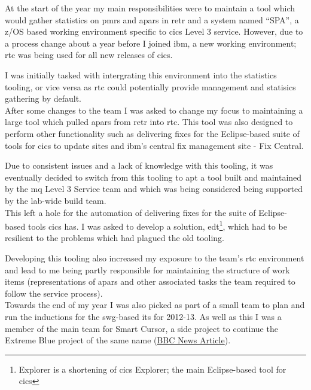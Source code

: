\documentclass[a4paper,11pt]{report}
\begin{document}
At the start of the year my main responsibilities were to maintain a tool which would gather 
statistics on \gls{pmr}s and \gls{apar}s in \gls{retr} and a system named ``SPA'', a z/OS based
working environment specific to \gls{cics} Level 3 service. However, due to a process change about
a year before I joined \gls{ibm}, a new working environment; \gls{rtc} was being used for all new
releases of \gls{cics}.

I was initially tasked with intergrating this environment into the 
statistics tooling, or vice versa as \gls{rtc} could potentially provide management and statisics
gathering by default. \\



After some changes to the team I was asked to change my focus to maintaining a large tool which
pulled \gls{apar}s from \gls{retr} into \gls{rtc}. This tool was also designed to perform other
functionality such as delivering fixes for the Eclipse-based suite of tools for \gls{cics} to
update sites and \gls{ibm}'s central fix management site - Fix Central.

Due to consistent issues and a lack of knowledge with this tooling, it was eventually decided to
switch from this tooling to \gls{apt} a tool built and maintained by the \gls{mq} Level 3 Service 
team and which was being considered being supported by the lab-wide build team. \\



This left a hole for the automation of delivering fixes for the suite of Eclipse-based tools 
\gls{cics} has. I was asked to develop a solution, \gls{edt}\footnote{Explorer is a shortening of 
\gls{cics} Explorer; the main Eclipse-based tool for \gls{cics}}, which had to be resilient to the
problems which had plagued the old tooling.

Developing this tooling also increased my exposure to the team's \gls{rtc} environment and lead to
me being partly responsible for maintaining the structure of work items (representations of 
\gls{apar}s and other associated tasks the team required to follow the service process). \\



Towards the end of my year I was also picked as part of a small team to plan and run the inductions
for the \gls{swg}-based \gls{it}s for 2012-13. As well as this I was a member of the main team for
Smart Cursor, a side project to continue the Extreme Blue project of the same name
(\href{http://www.bbc.co.uk/news/technology-14859157}{BBC News Article}).
\end{document}
